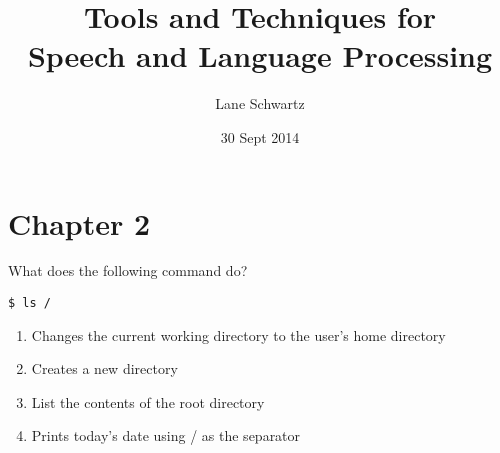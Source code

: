 \documentclass{beamer}
\title[LING 402]{Tools and Techniques for \\ Speech and Language Processing}
\author[Tuesday, 30 September 2014]{Lane Schwartz}
\institute[shortinst]{University of Illinois at Urbana-Champaign}
\date{30 Sept 2014}
\begin{document}


\frame{\titlepage}



\section{Chapter 2}



\begin{frame}[fragile]

What does the following command do?



\begin{verbatim}
$ ls /
\end{verbatim}

\begin{enumerate}[label=\Alph*)]

\item Changes the current working directory to the user's home directory

\item Creates a new directory

\item List the contents of the root directory

\item Prints today's date using / as the separator

\end{enumerate}

\end{frame}
\end{document}
